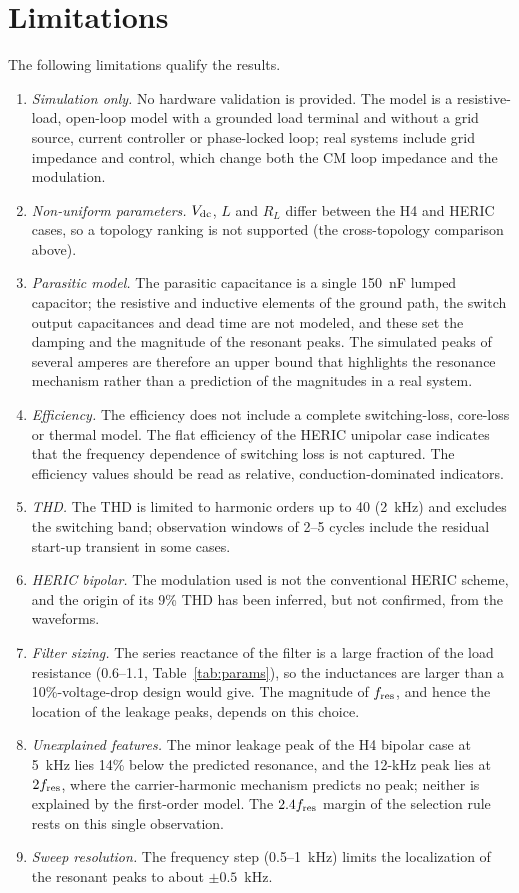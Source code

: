 \section{Limitations}
\label{sec:limits}
The following limitations qualify the results.
\begin{enumerate}
  \item \emph{Simulation only.} No hardware validation is provided. The model is a resistive-load, open-loop model with a grounded load terminal and without a grid source, current controller or phase-locked loop; real systems include grid impedance and control, which change both the CM loop impedance and the modulation.
  \item \emph{Non-uniform parameters.} $V_{\mathrm{dc}}$, $L$ and $R_L$ differ between the H4 and HERIC cases, so a topology ranking is not supported (the cross-topology comparison above).
  \item \emph{Parasitic model.} The parasitic capacitance is a single 150~nF lumped capacitor; the resistive and inductive elements of the ground path, the switch output capacitances and dead time are not modeled, and these set the damping and the magnitude of the resonant peaks. The simulated peaks of several amperes are therefore an upper bound that highlights the resonance mechanism rather than a prediction of the magnitudes in a real system.
  \item \emph{Efficiency.} The efficiency does not include a complete switching-loss, core-loss or thermal model. The flat efficiency of the HERIC unipolar case indicates that the frequency dependence of switching loss is not captured. The efficiency values should be read as relative, conduction-dominated indicators.
  \item \emph{THD.} The THD is limited to harmonic orders up to 40 (2~kHz) and excludes the switching band; observation windows of 2--5 cycles include the residual start-up transient in some cases.
  \item \emph{HERIC bipolar.} The modulation used is not the conventional HERIC scheme, and the origin of its 9\% THD has been inferred, but not confirmed, from the waveforms.
  \item \emph{Filter sizing.} The series reactance of the filter is a large fraction of the load resistance (0.6--1.1, Table~\ref{tab:params}), so the inductances are larger than a 10\%-voltage-drop design would give. The magnitude of $f_{\mathrm{res}}$, and hence the location of the leakage peaks, depends on this choice.
  \item \emph{Unexplained features.} The minor leakage peak of the H4 bipolar case at 5~kHz lies 14\% below the predicted resonance, and the 12-kHz peak lies at $2f_{\mathrm{res}}$, where the carrier-harmonic mechanism predicts no peak; neither is explained by the first-order model. The $2.4f_{\mathrm{res}}$ margin of the selection rule rests on this single observation.
  \item \emph{Sweep resolution.} The frequency step (0.5--1~kHz) limits the localization of the resonant peaks to about $\pm0.5$~kHz.
\end{enumerate}
